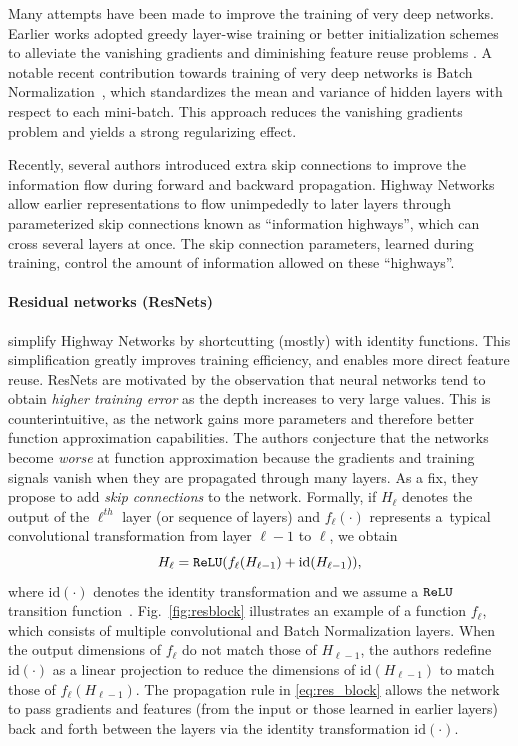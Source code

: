 
Many attempts have been made to improve the training of very deep networks. Earlier works adopted greedy layer-wise training or better initialization schemes
to alleviate the vanishing gradients and diminishing feature reuse problems \cite{fahlman1989cascade,erhan2010does,glorot2010understanding}.
A notable recent contribution towards training of very deep networks is Batch Normalization~\cite{ioffe2015batch}, which standardizes the mean and variance of hidden layers with respect to each mini-batch. This approach reduces the vanishing gradients problem and yields a strong regularizing effect.

Recently, several authors introduced extra skip connections to improve the information flow during forward and backward propagation. Highway Networks \cite{srivastava2015highway} allow earlier representations to flow unimpededly to later layers through parameterized skip connections known as ``information highways'', which can cross several layers at once. The skip connection parameters, learned during training, control the amount of information allowed on these ``highways''.

\paragraph{\textbf{Residual networks (ResNets)}\cite{he2015deep}} simplify Highway Networks by shortcutting (mostly) with identity functions. This simplification greatly improves training efficiency, and enables more direct feature reuse. ResNets are motivated by the observation that neural networks tend to obtain \emph{higher training error} as the depth increases to very large values. This is counterintuitive, as the network gains more parameters and therefore better function approximation capabilities. The authors conjecture that the networks become \emph{worse} at function approximation because the gradients and training signals vanish when they are propagated through many layers. As a fix, they propose to add \emph{skip connections} to the network. Formally, if $H_\ell$ denotes the output of the $\ell^{th}$ layer (or sequence of layers) and $f_\ell(\cdot)$ represents a\ typical convolutional transformation from layer $\ell\!-\!1$ to $\ell$, we obtain
\begin{equation}
\label{eq:res_block}
 H_{\ell} = {\tt ReLU} (f_\ell( H_{\ell-1}) + \text{id} (H_{\ell-1})),
\end{equation}
where $\text{id}(\cdot)$ denotes the identity transformation and we assume a ${\tt ReLU}$ transition function~\cite{nair2010rectified}. Fig.~\ref{fig:resblock} illustrates an example of a function $f_\ell$, which consists of multiple convolutional and Batch Normalization layers.
When the output dimensions of $f_\ell$ do not match those of $H_{\ell-1}$, the authors redefine $\text{id}(\cdot)$ as a linear projection to reduce the dimensions of $\text{id}(H_{\ell-1})$ to match those of $f_\ell(H_{\ell-1})$.
The propagation rule in \eqref{eq:res_block} allows the network to pass gradients and features (from the input or those learned in earlier layers) back and forth between the layers via the identity transformation $\text{id}(\cdot)$.

